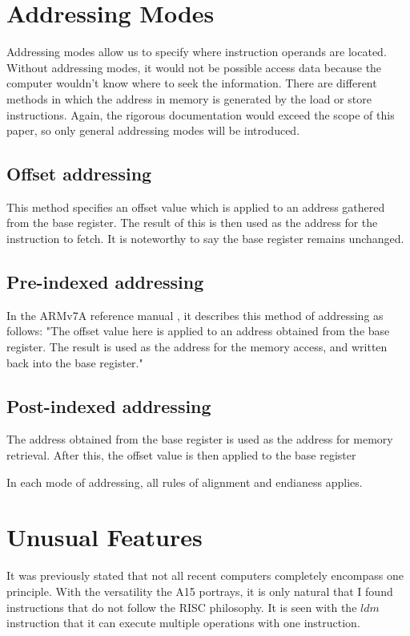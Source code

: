 \documentclass[12pt]{scrreprt}
\begin{document}
{\let\clearpage\relax\chapter{Addressing Modes}}

	Addressing modes allow us to specify where instruction operands are located.
	Without addressing modes, it would not be possible access data because the computer wouldn't know where to seek the information.
	There are different methods in which the address in memory is generated by the load or store instructions.
	Again, the rigorous documentation would exceed the scope of this paper, so only general addressing modes will be introduced.
	
	\section{Offset addressing}
		This method specifies an offset value which is applied to an address gathered from the base register.
		The result of this is then used as the address for the instruction to fetch.
		It is noteworthy to say the base register remains unchanged.

	\section{Pre-indexed addressing}
		In the ARMv7A reference manual \autocite{a7man}, it describes this method of addressing as follows:
		"The offset value here is applied to an address obtained from the base register.
		The result is used as the address for the memory access, and written back into the base register."

	\section{Post-indexed addressing}
		The address obtained from the base register is used as the address for memory retrieval.
		After this, the offset value is then applied to the base register

In each mode of addressing, all rules of alignment and endianess applies.

{\let\clearpage\relax\chapter{Unusual Features}}

	It was previously stated that not all recent computers completely encompass one principle.
	With the versatility the A15 portrays, it is only natural that I found instructions that do not follow the RISC philosophy.
	It is seen with the $ldm$ instruction that it can execute multiple operations with one instruction.
\end{document}
